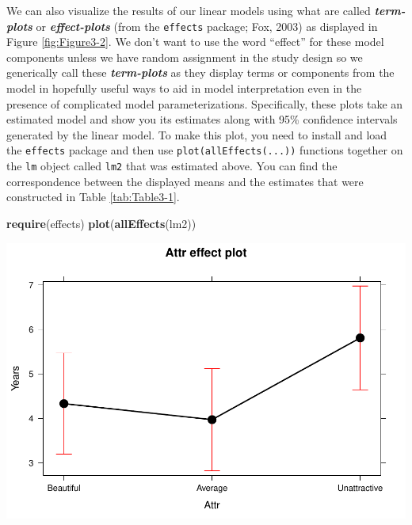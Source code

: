 \documentclass[]{book}
\newenvironment{Shaded}{\begin{snugshade}}{\end{snugshade}}
\newcommand{\KeywordTok}[1]{\textcolor[rgb]{0.13,0.29,0.53}{\textbf{#1}}}
\newcommand{\NormalTok}[1]{#1}
\begin{document}
We can also visualize the results of our linear models using what are
called \textbf{\emph{term-plots}} or \textbf{\emph{effect-plots}} (from
the \texttt{effects} package; Fox, 2003) as displayed in Figure
\ref{fig:Figure3-2}. We don't want to use the word ``effect'' for these
model components unless we have random assignment in the study design so
we generically call these \textbf{\emph{term-plots}} as they display
terms or components from the model in hopefully useful ways to aid in
model interpretation even in the presence of complicated model
parameterizations. Specifically, these plots take an estimated model and
show you its estimates along with 95\% confidence intervals generated by
the linear model. To make this plot, you need to install and load the
\texttt{effects} package and then use \texttt{plot(allEffects(...))}
functions together on the \texttt{lm} object called \texttt{lm2} that
was estimated above. You can find the correspondence between the
displayed means and the estimates that were constructed in Table
\ref{tab:Table3-1}.




\begin{Shaded}
\begin{Highlighting}[]
\KeywordTok{require}\NormalTok{(effects)}
\KeywordTok{plot}\NormalTok{(}\KeywordTok{allEffects}\NormalTok{(lm2))}
\end{Highlighting}
\end{Shaded}

\includegraphics{GreenwoodBanner_files/figure-latex/Figure3-2-1.pdf}
\end{document}

